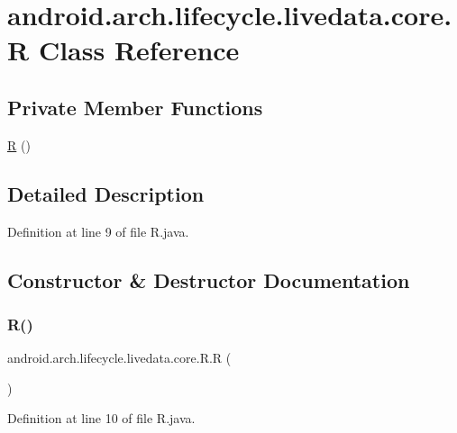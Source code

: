 \hypertarget{classandroid_1_1arch_1_1lifecycle_1_1livedata_1_1core_1_1_r}{}\section{android.\+arch.\+lifecycle.\+livedata.\+core.\+R Class Reference}
\label{classandroid_1_1arch_1_1lifecycle_1_1livedata_1_1core_1_1_r}
\subsection*{Private Member Functions}
\begin{DoxyCompactItemize}
\item 
\mbox{\hyperlink{classandroid_1_1arch_1_1lifecycle_1_1livedata_1_1core_1_1_r_a7fc432c4c258018b64541028c6f7a67b}{R}} ()
\end{DoxyCompactItemize}


\subsection{Detailed Description}


Definition at line 9 of file R.\+java.



\subsection{Constructor \& Destructor Documentation}
\mbox{\label{classandroid_1_1arch_1_1lifecycle_1_1livedata_1_1core_1_1_r_a7fc432c4c258018b64541028c6f7a67b}} 
\subsubsection{\texorpdfstring{R()}{R()}}
{\footnotesize\ttfamily android.\+arch.\+lifecycle.\+livedata.\+core.\+R.\+R (\begin{DoxyParamCaption}{ }\end{DoxyParamCaption})\hspace{0.3cm}{\ttfamily [private]}}



Definition at line 10 of file R.\+java.



